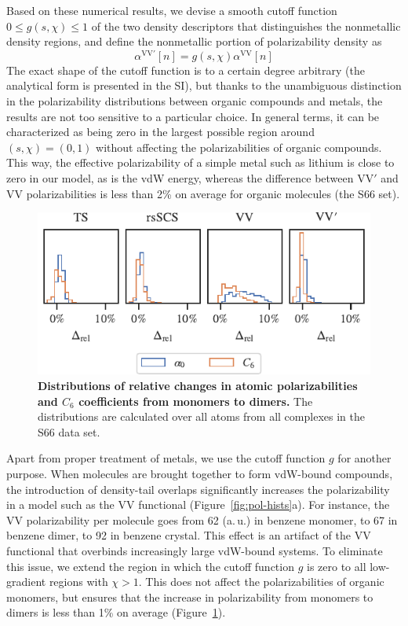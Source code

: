 Based on these numerical results, we devise a smooth cutoff function $0\leq g(s,\chi)\leq 1$ of the two density descriptors that distinguishes the nonmetallic density regions, and define the nonmetallic portion of polarizability density as
\begin{equation}
  \alpha^\mathrm{VV'}[n]=g(s,\chi)\alpha^\text{VV}[n]
\end{equation}
The exact shape of the cutoff function is to a certain degree arbitrary (the analytical form is presented in the SI), but thanks to the unambiguous distinction in the polarizability distributions between organic compounds and metals, the results are not too sensitive to a particular choice.
In general terms, it can be characterized as being zero in the largest possible region around $(s,\chi)=(0,1)$ without affecting the polarizabilities of organic compounds.
This way, the effective polarizability of a simple metal such as lithium is close to zero in our model, as is the vdW energy, whereas the difference between VV$'$ and VV polarizabilities is less than 2\% on average for organic molecules (the S66 set).

\begin{figure}[t!]
\centering
\includegraphics{../media/pol-shifts.pdf}
\caption{\textbf{Distributions of relative changes in atomic polarizabilities and $C_6$ coefficients from monomers to dimers.}
The distributions are calculated over all atoms from all complexes in the S66 data set.
}\label{fig:pol-shifts}
\end{figure}

Apart from proper treatment of metals, we use the cutoff function $g$ for another purpose.
When molecules are brought together to form vdW-bound compounds, the introduction of density-tail overlaps significantly increases the polarizability in a model such as the VV functional (Figure~\ref{fig:pol-hists}a).
For instance, the VV polarizability per molecule goes from 62 (a.\,u.) in benzene monomer, to 67 in benzene dimer, to 92 in benzene crystal.
This effect is an artifact of the VV functional that overbinds increasingly large vdW-bound systems.
To eliminate this issue, we extend the region in which the cutoff function $g$ is zero to all low-gradient regions with $\chi>1$.
This does not affect the polarizabilities of organic monomers, but ensures that the increase in polarizability from monomers to dimers is less than 1\% on average (Figure~\ref{fig:pol-shifts}).

